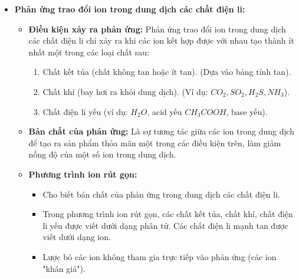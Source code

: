 \begin{phuongphap}
\begin{itemize}
\begin{itemize}
\begin{itemize}
		                    \item Base yếu ($B$ nồng độ $C_b$, hằng số $K_b$): Tính $[OH^-]$ từ cân bằng $B + H_2O \rightleftharpoons BH^+ + OH^-$. Thường $[OH^-] \approx \sqrt{K_b \cdot C_b}$. Rồi tính $pOH \Rightarrow pH$.
		                \end{itemize}
	            \item \textbf{Chất chỉ thị acid-base:} Là chất có màu biến đổi phụ thuộc vào giá trị pH của dung dịch. Ví dụ: quỳ tím (đỏ trong acid, xanh trong base, không đổi màu trong trung tính), phenolphthalein (không màu trong acid và trung tính, hồng trong base có $pH \ge 8,3$).
	        \end{itemize}
    \item \textbf{Phản ứng trao đổi ion trong dung dịch các chất điện li:}
        \begin{itemize}
	            \item \textbf{Điều kiện xảy ra phản ứng:} Phản ứng trao đổi ion trong dung dịch các chất điện li chỉ xảy ra khi các ion kết hợp được với nhau tạo thành ít nhất một trong các loại chất sau:
	                \begin{enumerate}
		                    \item Chất kết tủa (chất không tan hoặc ít tan). (Dựa vào bảng tính tan).
		                    \item Chất khí (bay hơi ra khỏi dung dịch). (Ví dụ: $CO_2, SO_2, H_2S, NH_3$).
		                    \item Chất điện li yếu (ví dụ: $H_2O$, acid yếu $CH_3COOH$, base yếu).
		                \end{enumerate}
	            \item \textbf{Bản chất của phản ứng:} Là sự tương tác giữa các ion trong dung dịch để tạo ra sản phẩm thỏa mãn một trong các điều kiện trên, làm giảm nồng độ của một số ion trong dung dịch.
	            \item \textbf{Phương trình ion rút gọn:}
	                \begin{itemize}
		                    \item Cho biết bản chất của phản ứng trong dung dịch các chất điện li.
		                    \item Trong phương trình ion rút gọn, các chất kết tủa, chất khí, chất điện li yếu được viết dưới dạng phân tử. Các chất điện li mạnh tan được viết dưới dạng ion.
		                    \item Lược bỏ các ion không tham gia trực tiếp vào phản ứng (các ion "khán giả").

\end{itemize}
\end{itemize}
\end{itemize}
\end{phuongphap}

